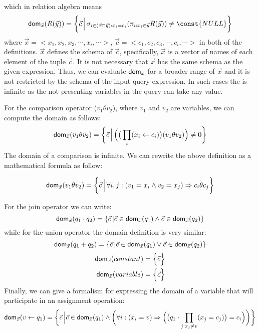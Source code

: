 \documentclass[12pt]{article}
\begin{document}
which in relation algebra means 
\begin{equation}
\dom{}_{\vec x}(R(\vec y))=\bigg\{\vec c\,\Big|\,\sigma_{i\in(\vec{x}\cap\vec{y}):x_{i}=c_{i}}(\pi_{i:x_{i}\in \vec y} R(\vec y))\not= \const{NULL}\bigg\}
\end{equation}
where $\vec x=<x_1,x_2,x_3,\cdots,x_i,\cdots>$, $\vec c=<c_1,c_2,c_3,\cdots,c_i,\cdots>$ in both of the definitions.  $\vec{x}$ defines the schema of $\vec{c}$, specifically, $\vec{x}$ is a vector of names of each element of the tuple $\vec{c}$. It is not necessary that $\vec{x}$  has the same schema as the given expression. Thus, we can evaluate $\text{\textsf{dom}}_{\vec{x}}$ for a broader range of $\vec{x}$ and it is not restricted by the schema of the input query expression. In such cases the \dom{} is infinite as the not presenting variables in the query can take any value.

For the comparison operator ($v_{1}\theta v_{2}$), where $v_1$ and $v_2$ are variables, we can compute the domain as follows:
\begin{equation}
\text{\textsf{dom}{}}_{\vec{x}}(v_{1}\theta v_{2})=\bigg\{\vec{c}\,\Big|\,\Big(\big(\prod_{i}(x_{i}\gets c_{i})\big)(v_{1}\theta v_{2})\Big)\not= 0\bigg\}
\end{equation}
The domain of a comparison is infinite. We can rewrite the above definition as a mathematical formula as follow:

\begin{equation}
\text{\textsf{dom}{}}_{\vec{x}}(v_{1}\theta v_{2})=\bigg\{\vec{c}\,\Big|\,\forall i,j:(v_{1}=x_{i}\land v_{2}=x_{j})\Rightarrow c_{i}\theta c_{j}\bigg\}
\end{equation}

For the join operator we can write:
\begin{equation}
\label{def:join}
\text{\textsf{dom}{}}_{\vec{x}}(q_{1}\cdot q_{2})=\{\vec{c}\,|\vec{c}\in\text{\textsf{dom}{}}_{\vec{x}}(q_{1})\land\vec{c}\in\text{\textsf{dom}{}}_{\vec{x}}(q_{2})\}
\end{equation}
while for the union operator the domain definition is very similar:
\begin{equation}
\label{def:plus}
\text{\textsf{dom}{}}_{\vec{x}}(q_{1}+ q_{2})=\{\vec{c}\,|\vec{c}\in\text{\textsf{dom}{}}_{\vec{x}}(q_{1})\lor\vec{c}\in\text{\textsf{dom}{}}_{\vec{x}}(q_{2})\}
\end{equation}
\begin{eqnarray}
\textsf{dom}{}_{\vec x}(constant)=\Big\{\vec c\Big\}\\
\textsf{dom}{}_{\vec x}(variable)=\Big\{\vec c\Big\}
\end{eqnarray}
Finally, we can give a formalism for expressing the domain of a variable that will participate in an assignment operation:
\begin{equation}
\label{assign1}
\text{\textsf{dom}{}}_{\vec{x}}(v\gets q_{1})=\bigg\{\vec{c}\,\Big|\vec{c}\in\text{\textsf{dom}{}}_{\vec{x}}(q_{1})\land \bigg(\forall i:(x_{i}=v)\Rightarrow\Big(\big(q_{1}\cdot\prod_{j:x_{j}\neq v } (x_{j}=c_{j})\big)=c_{i}\Big)\bigg)\bigg\}
\end{equation}
\end{document}
